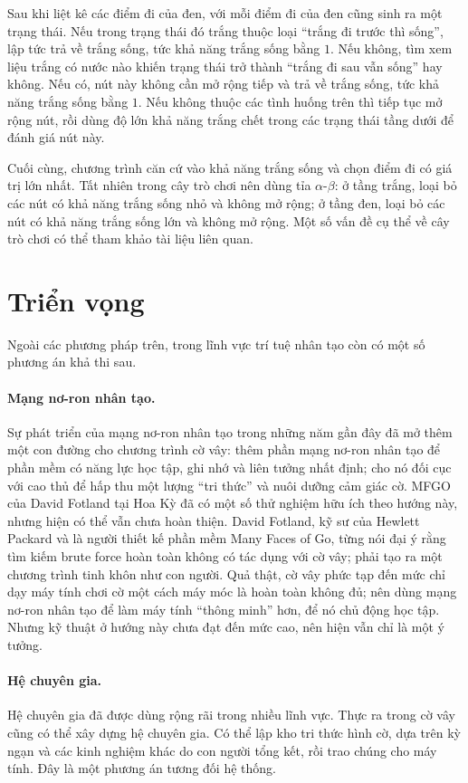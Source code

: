 \documentclass[11pt]{article}
\begin{document}
Sau khi liệt kê các điểm đi của đen, với mỗi điểm đi của đen cũng sinh ra
một trạng thái. Nếu trong trạng thái đó trắng thuộc loại ``trắng đi trước thì
sống'', lập tức trả về trắng sống, tức khả năng trắng sống bằng \(1\). Nếu
không, tìm xem liệu trắng có nước nào khiến trạng thái trở thành ``trắng đi
sau vẫn sống'' hay không. Nếu có, nút này không cần mở rộng tiếp và trả về
trắng sống, tức khả năng trắng sống bằng \(1\). Nếu không thuộc các tình
huống trên thì tiếp tục mở rộng nút, rồi dùng độ lớn khả năng trắng chết
trong các trạng thái tầng dưới để đánh giá nút này.

Cuối cùng, chương trình căn cứ vào khả năng trắng sống và chọn điểm đi có giá
trị lớn nhất. Tất nhiên trong cây trò chơi nên dùng tỉa \(\alpha\)-\(\beta\):
ở tầng trắng, loại bỏ các nút có khả năng trắng sống nhỏ và không mở rộng;
ở tầng đen, loại bỏ các nút có khả năng trắng sống lớn và không mở rộng. Một
số vấn đề cụ thể về cây trò chơi có thể tham khảo tài liệu liên quan.

\section{Triển vọng}

Ngoài các phương pháp trên, trong lĩnh vực trí tuệ nhân tạo còn có một số
phương án khả thi sau.

\paragraph{Mạng nơ-ron nhân tạo.}
Sự phát triển của mạng nơ-ron nhân tạo trong những năm gần đây đã mở thêm một
con đường cho chương trình cờ vây: thêm phần mạng nơ-ron nhân tạo để phần mềm
có năng lực học tập, ghi nhớ và liên tưởng nhất định; cho nó đối cục với cao
thủ để hấp thu một lượng ``tri thức'' và nuôi dưỡng cảm giác cờ. MFGO của
David Fotland tại Hoa Kỳ đã có một số thử nghiệm hữu ích theo hướng này,
nhưng hiện có thể vẫn chưa hoàn thiện. David Fotland, kỹ sư của Hewlett
Packard và là người thiết kế phần mềm Many Faces of Go, từng nói đại ý rằng
tìm kiếm brute force hoàn toàn không có tác dụng với cờ vây; phải tạo ra một
chương trình tinh khôn như con người. Quả thật, cờ vây phức tạp đến mức chỉ
dạy máy tính chơi cờ một cách máy móc là hoàn toàn không đủ; nên dùng mạng
nơ-ron nhân tạo để làm máy tính ``thông minh'' hơn, để nó chủ động học tập.
Nhưng kỹ thuật ở hướng này chưa đạt đến mức cao, nên hiện vẫn chỉ là một ý
tưởng.

\paragraph{Hệ chuyên gia.}
Hệ chuyên gia đã được dùng rộng rãi trong nhiều lĩnh vực. Thực ra trong cờ
vây cũng có thể xây dựng hệ chuyên gia. Có thể lập kho tri thức hình cờ, dựa
trên kỳ ngạn và các kinh nghiệm khác do con người tổng kết, rồi trao chúng
cho máy tính. Đây là một phương án tương đối hệ thống.
\end{document}
